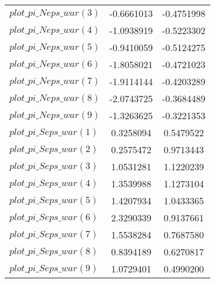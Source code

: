 \begin{center}
\begin{longtable}{lcc}
$plot\_pi\_N eps\_war (3)   $	 & 	     -0.6661013	 & 	     -0.4751998 \\ 
$plot\_pi\_N eps\_war (4)   $	 & 	     -1.0938919	 & 	     -0.5223302 \\ 
$plot\_pi\_N eps\_war (5)   $	 & 	     -0.9410059	 & 	     -0.5124275 \\ 
$plot\_pi\_N eps\_war (6)   $	 & 	     -1.8058021	 & 	     -0.4721023 \\ 
$plot\_pi\_N eps\_war (7)   $	 & 	     -1.9114144	 & 	     -0.4203289 \\ 
$plot\_pi\_N eps\_war (8)   $	 & 	     -2.0743725	 & 	     -0.3684489 \\ 
$plot\_pi\_N eps\_war (9)   $	 & 	     -1.3263625	 & 	     -0.3221353 \\ 
$plot\_pi\_S eps\_war (1)   $	 & 	      0.3258094	 & 	      0.5479522 \\ 
$plot\_pi\_S eps\_war (2)   $	 & 	      0.2575472	 & 	      0.9713443 \\ 
$plot\_pi\_S eps\_war (3)   $	 & 	      1.0531281	 & 	      1.1220239 \\ 
$plot\_pi\_S eps\_war (4)   $	 & 	      1.3539988	 & 	      1.1273104 \\ 
$plot\_pi\_S eps\_war (5)   $	 & 	      1.4207934	 & 	      1.0433365 \\ 
$plot\_pi\_S eps\_war (6)   $	 & 	      2.3290339	 & 	      0.9137661 \\ 
$plot\_pi\_S eps\_war (7)   $	 & 	      1.5538284	 & 	      0.7687580 \\ 
$plot\_pi\_S eps\_war (8)   $	 & 	      0.8394189	 & 	      0.6270817 \\ 
$plot\_pi\_S eps\_war (9)   $	 & 	      1.0729401	 & 	      0.4990200 \\ 
\end{longtable}
 \end{center}
